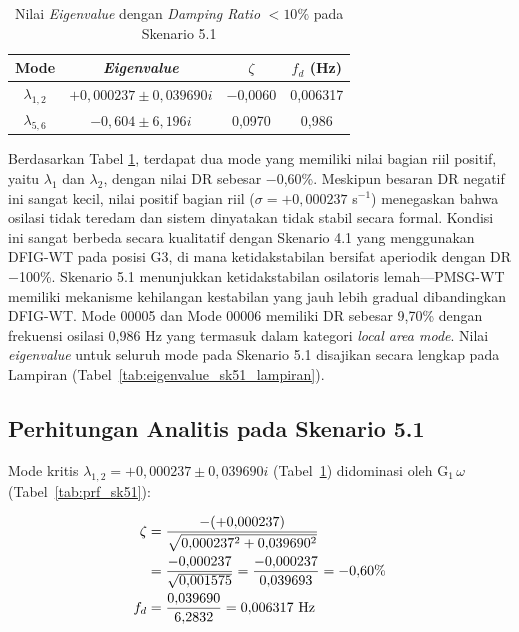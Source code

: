 \begin{table}[h]
	\caption{Nilai \textit{Eigenvalue} dengan \textit{Damping Ratio} $<10\%$
	pada Skenario 5.1}
	\vspace{0.5em}
	\centering
	\fontsize{12}{14.4}\selectfont
	\setlength{\tabcolsep}{6pt}
	\begin{tabular}{c c c c}
		\toprule
		\textbf{Mode} & \textbf{\textit{Eigenvalue}} & \textbf{$\zeta$} &
		\textbf{$f_d$ (Hz)} \\
		\midrule
		$\lambda_{1,2}$ & $+0{,}000237 \pm 0{,}039690i$ & $-$0,0060 & 0,006317 \\
		$\lambda_{5,6}$ & $-0{,}604 \pm 6{,}196i$ & 0,0970 & 0,986 \\
		\bottomrule
	\end{tabular}
	\label{tab:eigenvalue_sk51}
\end{table}

Berdasarkan Tabel \ref{tab:eigenvalue_sk51}, terdapat dua mode yang memiliki
nilai bagian riil positif, yaitu $\lambda_1$ dan $\lambda_2$, dengan nilai DR
sebesar $-$0,60\%. Meskipun besaran DR negatif ini sangat kecil, nilai positif
bagian riil ($\sigma = +0{,}000237$ s$^{-1}$) menegaskan bahwa osilasi tidak
teredam dan sistem dinyatakan tidak stabil secara formal. Kondisi ini sangat
berbeda secara kualitatif dengan Skenario 4.1 yang menggunakan DFIG-WT pada
posisi G3, di mana ketidakstabilan bersifat aperiodik dengan DR $-$100\%.
Skenario 5.1 menunjukkan ketidakstabilan osilatoris lemah---PMSG-WT memiliki
mekanisme kehilangan kestabilan yang jauh lebih gradual dibandingkan DFIG-WT.
Mode 00005 dan Mode 00006 memiliki DR sebesar 9,70\% dengan frekuensi osilasi
0,986 Hz yang termasuk dalam kategori
\textit{local area mode}. Nilai \textit{eigenvalue} untuk seluruh mode pada
Skenario 5.1 disajikan secara lengkap pada Lampiran (Tabel~\ref{tab:eigenvalue_sk51_lampiran}).

\subsection{Perhitungan Analitis pada Skenario 5.1}

Mode kritis $\lambda_{1,2} = +0{,}000237 \pm 0{,}039690i$
(Tabel~\ref{tab:eigenvalue_sk51}) didominasi oleh G$_1\,\omega$
(Tabel~\ref{tab:prf_sk51}):

\begin{align}
    \zeta &= \frac{-(+0{,}000237)}{\sqrt{0{,}000237^2 + 0{,}039690^2}} \notag \\
          &= \frac{-0{,}000237}{\sqrt{0{,}001575}}
           = \frac{-0{,}000237}{0{,}039693} = -0{,}60\% \\
    f_d   &= \frac{0{,}039690}{6{,}2832} = 0{,}006317 \text{ Hz}
\end{align}

